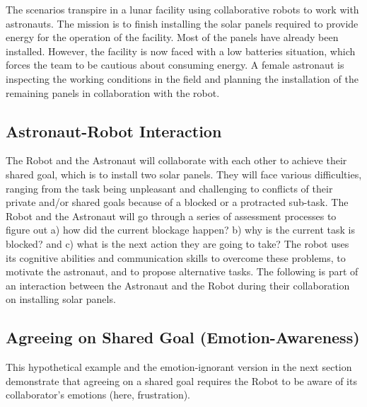 The scenarios transpire in a lunar facility using collaborative robots to work
with astronauts. The mission is to finish installing the solar panels required
to provide energy for the operation of the facility. Most of the panels have
already been installed. However, the facility is now faced with a low batteries
situation, which forces the team to be cautious about consuming energy. A female
astronaut is inspecting the working conditions in the field and planning the
installation of the remaining panels in collaboration with the robot.

\subsection{Astronaut-Robot Interaction}

The Robot and the Astronaut will collaborate with each other to achieve their
shared goal, which is to install two solar panels. They will face various
difficulties, ranging from the task being unpleasant and challenging to
conflicts of their private and/or shared goals because of a blocked or a
protracted sub-task. The Robot and the Astronaut will go through a series of
assessment processes to figure out a) how did the current blockage happen? b)
why is the current task is blocked? and c) what is the next action they are
going to take? The robot uses its cognitive abilities and communication skills
to overcome these problems, to motivate the astronaut, and to propose
alternative tasks. The following is part of an interaction between the Astronaut
and the Robot during their collaboration on installing solar panels.

\subsection{Agreeing on Shared Goal (Emotion-Awareness)}
\label{sec:exp1}

This hypothetical example and the emotion-ignorant version in the next section
demonstrate that agreeing on a shared goal requires the Robot to be aware of its
collaborator's emotions (here, frustration). 

